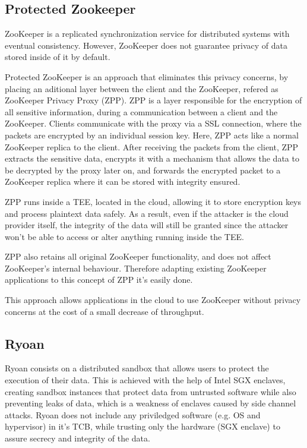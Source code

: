 \subsection{Protected Zookeeper}
\label{ssec:protected_zookeeper}

ZooKeeper \cite{zookeeper} is a replicated synchronization service for distributed systems with eventual consistency. However, ZooKeeper does not guarantee privacy of data stored inside of it by default.

Protected ZooKeeper \cite{protectedZooKeeper} is an approach that eliminates this privacy concerns, by placing an aditional layer between the client and the ZooKeeper, refered as ZooKeeper Privacy Proxy (ZPP). ZPP is a layer responsible for the encryption of all sensitive information, during a communication between a client and the ZooKeeper. 
Clients communicate with the proxy via a SSL connection, where the packets are encrypted by an individual session key. Here, ZPP acts like a normal ZooKeeper replica to the client. 
After receiving the packets from the client, ZPP extracts the sensitive data, encrypts it with a mechanism that allows the data to be decrypted by the proxy later on, and forwards the encrypted packet to a ZooKeeper replica where it can be stored with integrity ensured.

ZPP runs inside a TEE, located in the cloud, allowing it to store encryption keys and process plaintext data safely. As a result, even if the attacker is the cloud provider itself, the integrity of the data will still be granted since the attacker won't be able to access or alter anything running inside the TEE.

ZPP also retains all original ZooKeeper functionality, and does not affect ZooKeeper's internal behaviour. Therefore adapting existing ZooKeeper applications to this concept of ZPP it's easily done.

This approach allows applications in the cloud to use ZooKeeper without privacy concerns at the cost of a small decrease of throughput.
\subsection{Ryoan}
\label{ssec:ryoan_sandboxing}

Ryoan \cite{ryoanPaper} consists on a distributed sandbox that allows users to protect the execution of their data. This is achieved with the help of Intel SGX \cite{intelSGX} \cite{sgxPaper} enclaves, creating sandbox instances that protect data from untrusted software while also preventing leaks of data, which is a weakness of enclaves caused by side channel attacks.
Ryoan does not include any priviledged software (e.g. OS and hypervisor) in it's TCB, while trusting only the hardware (SGX enclave) to assure secrecy and integrity of the data.

